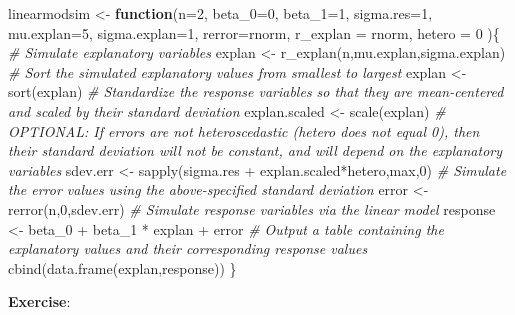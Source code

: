 \documentclass[
]{book}
\newenvironment{Shaded}{\begin{snugshade}}{\end{snugshade}}
\newcommand{\AttributeTok}[1]{\textcolor[rgb]{0.77,0.63,0.00}{#1}}
\newcommand{\CommentTok}[1]{\textcolor[rgb]{0.56,0.35,0.01}{\textit{#1}}}
\newcommand{\ControlFlowTok}[1]{\textcolor[rgb]{0.13,0.29,0.53}{\textbf{#1}}}
\newcommand{\DecValTok}[1]{\textcolor[rgb]{0.00,0.00,0.81}{#1}}
\newcommand{\FunctionTok}[1]{\textcolor[rgb]{0.00,0.00,0.00}{#1}}
\newcommand{\NormalTok}[1]{#1}
\newcommand{\OtherTok}[1]{\textcolor[rgb]{0.56,0.35,0.01}{#1}}
\newcommand{\SpecialCharTok}[1]{\textcolor[rgb]{0.00,0.00,0.00}{#1}}
\begin{document}
\begin{Shaded}
\begin{Highlighting}[]
\NormalTok{linearmodsim }\OtherTok{\textless{}{-}} \ControlFlowTok{function}\NormalTok{(}\AttributeTok{n=}\DecValTok{2}\NormalTok{, }\AttributeTok{beta\_0=}\DecValTok{0}\NormalTok{, }\AttributeTok{beta\_1=}\DecValTok{1}\NormalTok{, }\AttributeTok{sigma.res=}\DecValTok{1}\NormalTok{, }\AttributeTok{mu.explan=}\DecValTok{5}\NormalTok{, }\AttributeTok{sigma.explan=}\DecValTok{1}\NormalTok{, }\AttributeTok{rerror=}\NormalTok{rnorm, }\AttributeTok{r\_explan =}\NormalTok{ rnorm, }\AttributeTok{hetero =} \DecValTok{0}\NormalTok{ )\{}
  \CommentTok{\# Simulate explanatory variables}
\NormalTok{  explan }\OtherTok{\textless{}{-}} \FunctionTok{r\_explan}\NormalTok{(n,mu.explan,sigma.explan)}
  \CommentTok{\# Sort the simulated explanatory values from smallest to largest}
\NormalTok{  explan }\OtherTok{\textless{}{-}} \FunctionTok{sort}\NormalTok{(explan)}
  \CommentTok{\# Standardize the response variables so that they are  mean{-}centered and scaled by their standard deviation}
\NormalTok{  explan.scaled }\OtherTok{\textless{}{-}} \FunctionTok{scale}\NormalTok{(explan)}
  \CommentTok{\# OPTIONAL: If errors are not heteroscedastic (hetero does not equal 0), then their standard deviation will not be constant, and will depend on the explanatory variables }
\NormalTok{  sdev.err }\OtherTok{\textless{}{-}} \FunctionTok{sapply}\NormalTok{(sigma.res }\SpecialCharTok{+}\NormalTok{ explan.scaled}\SpecialCharTok{*}\NormalTok{hetero,max,}\DecValTok{0}\NormalTok{)}
  \CommentTok{\# Simulate the error values using the above{-}specified standard deviation}
\NormalTok{  error }\OtherTok{\textless{}{-}} \FunctionTok{rerror}\NormalTok{(n,}\DecValTok{0}\NormalTok{,sdev.err)}
  \CommentTok{\# Simulate response variables via the linear model}
\NormalTok{  response }\OtherTok{\textless{}{-}}\NormalTok{ beta\_0 }\SpecialCharTok{+}\NormalTok{ beta\_1 }\SpecialCharTok{*}\NormalTok{ explan }\SpecialCharTok{+}\NormalTok{ error}
  \CommentTok{\# Output a table containing the explanatory values and their corresponding response values}
  \FunctionTok{cbind}\NormalTok{(}\FunctionTok{data.frame}\NormalTok{(explan,response))}
\NormalTok{\}}
\end{Highlighting}
\end{Shaded}

\textbf{Exercise}:
\end{document}
